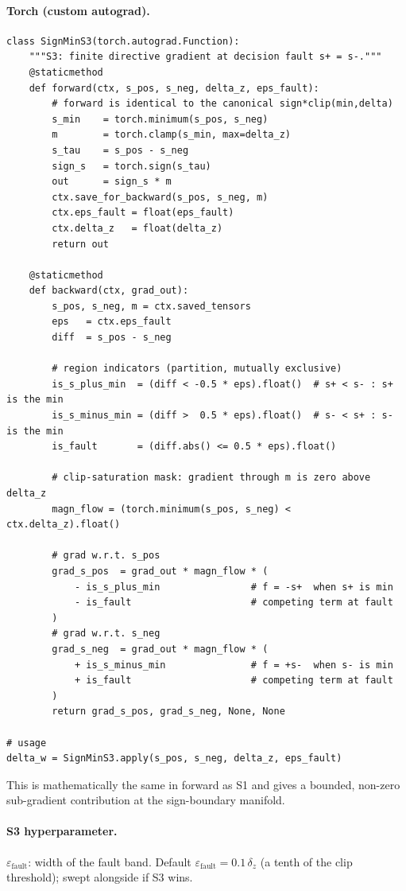 \documentclass[11pt]{article}
\begin{document}
\paragraph{Torch (custom autograd).}

\begin{lstlisting}
class SignMinS3(torch.autograd.Function):
    """S3: finite directive gradient at decision fault s+ = s-."""
    @staticmethod
    def forward(ctx, s_pos, s_neg, delta_z, eps_fault):
        # forward is identical to the canonical sign*clip(min,delta)
        s_min    = torch.minimum(s_pos, s_neg)
        m        = torch.clamp(s_min, max=delta_z)
        s_tau    = s_pos - s_neg
        sign_s   = torch.sign(s_tau)
        out      = sign_s * m
        ctx.save_for_backward(s_pos, s_neg, m)
        ctx.eps_fault = float(eps_fault)
        ctx.delta_z   = float(delta_z)
        return out

    @staticmethod
    def backward(ctx, grad_out):
        s_pos, s_neg, m = ctx.saved_tensors
        eps   = ctx.eps_fault
        diff  = s_pos - s_neg

        # region indicators (partition, mutually exclusive)
        is_s_plus_min  = (diff < -0.5 * eps).float()  # s+ < s- : s+ is the min
        is_s_minus_min = (diff >  0.5 * eps).float()  # s- < s+ : s- is the min
        is_fault       = (diff.abs() <= 0.5 * eps).float()

        # clip-saturation mask: gradient through m is zero above delta_z
        magn_flow = (torch.minimum(s_pos, s_neg) < ctx.delta_z).float()

        # grad w.r.t. s_pos
        grad_s_pos  = grad_out * magn_flow * (
            - is_s_plus_min                # f = -s+  when s+ is min
            - is_fault                     # competing term at fault
        )
        # grad w.r.t. s_neg
        grad_s_neg  = grad_out * magn_flow * (
            + is_s_minus_min               # f = +s-  when s- is min
            + is_fault                     # competing term at fault
        )
        return grad_s_pos, grad_s_neg, None, None

# usage
delta_w = SignMinS3.apply(s_pos, s_neg, delta_z, eps_fault)
\end{lstlisting}

This is mathematically the same in forward as S1 and gives a bounded,
non-zero sub-gradient contribution at the sign-boundary manifold.

\paragraph{S3 hyperparameter.}
$\varepsilon_{\text{fault}}$: width of the fault band. Default
$\varepsilon_{\text{fault}} = 0.1\,\delta_z$ (a tenth of the clip
threshold); swept alongside if S3 wins.
\end{document}
